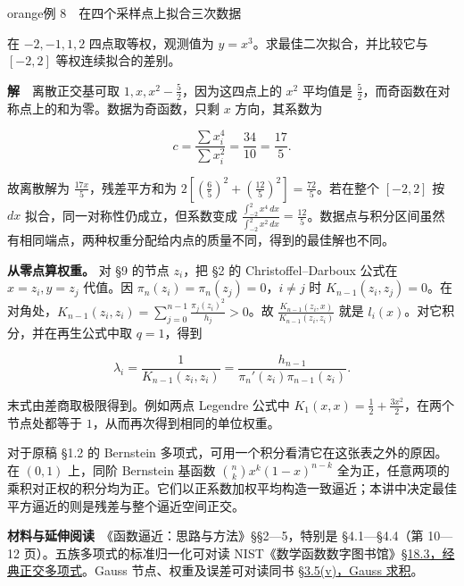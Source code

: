 \documentclass[11pt,a4paper]{article}
\begin{document}
\begin{sboxenv}{orange}{例 8　在四个采样点上拟合三次数据}

在 \(-2,-1,1,2\) 四点取等权，观测值为 \(y=x^3\)。求最佳二次拟合，并比较它与 \([-2,2]\) 等权连续拟合的差别。

\end{sboxenv}

\textbf{解}　离散正交基可取 \(1,x,x^2-\frac{5}{2}\)，因为这四点上的 \(x^2\) 平均值是 \(\frac{5}{2}\)，而奇函数在对称点上的和为零。数据为奇函数，只剩 \(x\) 方向，其系数为

\[
c=\frac{\sum x_i^4}{\sum x_i^2}=\frac{34}{10}=\frac{17}{5}.
\]

故离散解为 \(\frac{17x}{5}\)，残差平方和为 \(2[(\frac{6}{5})^2+(\frac{12}{5})^2]=\frac{72}{5}\)。若在整个 \([-2,2]\) 按 \(dx\) 拟合，同一对称性仍成立，但系数变成 \(\frac{\int_{-2}^2x^4\,dx}{\int_{-2}^2x^2\,dx}=\frac{12}{5}\)。数据点与积分区间虽然有相同端点，两种权重分配给内点的质量不同，得到的最佳解也不同。

\textbf{从零点算权重。} 对 §9 的节点 \(z_i\)，把 §2 的 Christoffel--Darboux 公式在 \(x=z_i,y=z_j\) 代值。因 \(\pi_n(z_i)=\pi_n(z_j)=0\)，\(i\ne j\) 时 \(K_{n-1}(z_i,z_j)=0\)。在对角处，\(K_{n-1}(z_i,z_i)=\sum_{j=0}^{n-1}\frac{\pi_j(z_i)^2}{h_j}>0\)。故 \(\frac{K_{n-1}(z_i,x)}{K_{n-1}(z_i,z_i)}\) 就是 \(l_i(x)\)。对它积分，并在再生公式中取 \(q=1\)，得到

\[
\lambda_i=\frac{1}{K_{n-1}(z_i,z_i)}
=\frac{h_{n-1}}{\pi_n'(z_i)\pi_{n-1}(z_i)} .
\]

末式由差商取极限得到。例如两点 Legendre 公式中 \(K_1(x,x)=\frac{1}{2}+\frac{3x^2}{2}\)，在两个节点处都等于 \(1\)，从而再次得到相同的单位权重。

对于原稿 §1.2 的 Bernstein 多项式，可用一个积分看清它在这张表之外的原因。在 \((0,1)\) 上，同阶 Bernstein 基函数 \(\binom nk x^k(1-x)^{n-k}\) 全为正，任意两项的乘积对正权的积分均为正。它们以正系数加权平均构造一致逼近；本讲中决定最佳平方逼近的则是残差与整个逼近空间正交。

\textbf{材料与延伸阅读}　《函数逼近：思路与方法》§§2---5，特别是 §4.1---§4.4（第 10---12 页）。五族多项式的标准归一化可对读 NIST《数学函数数字图书馆》\href{https://dlmf.nist.gov/18.3}{§18.3，经典正交多项式}。Gauss 节点、权重及误差可对读同书 \href{https://dlmf.nist.gov/3.5\#v}{§3.5(v)，Gauss 求积}。
\end{document}
